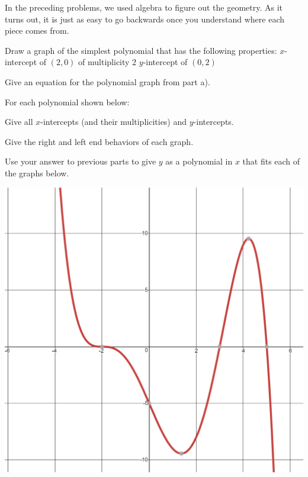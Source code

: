 In the preceding problems, we used algebra to figure out the geometry. As it turns out, it is just as easy to go backwards once you understand where each piece comes from.
\bq
\be
\item Draw a graph of the simplest polynomial that has the following properties:
\subitem $x$-intercept of $(2,0)$ of multiplicity 2
\subitem $y$-intercept of $(0,2)$
\item Give an equation for the polynomial graph from part a).
\ee
\eq

\bq For each polynomial shown below:
\be
\item Give all $x$-intercepts (and their multiplicities) and $y$-intercepts.
\item Give the right and left end behaviors of each graph.
\item Use your answer to previous parts to give $y$ as a polynomial in $x$ that fits each of the graphs below.
\ee
\begin{center} \includegraphics[scale=.3]{p3.png} \end{center}

